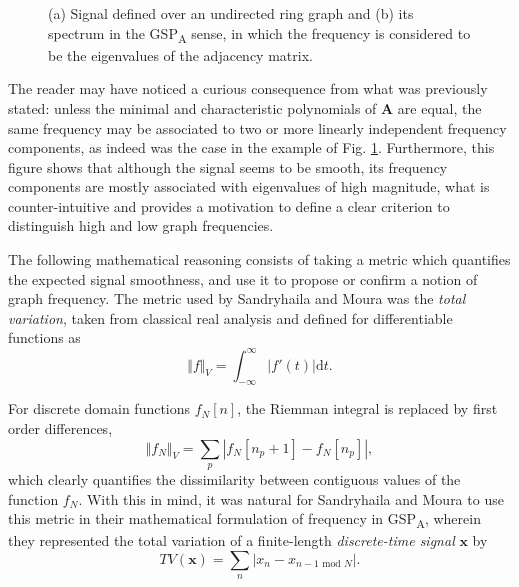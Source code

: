 \begin{figure}
\begin{minipage}[c]{0.25\linewidth}
{		}
	\end{minipage}%
	\caption{(a) Signal defined over an undirected ring graph and (b) its spectrum in the GSP\textsubscript{A} sense, in which the frequency is considered to be the eigenvalues of the adjacency matrix.}%
	\label{fig:diff_struct_GSPA}%
	\vspace{-0.2cm}
\end{figure}

The reader may have noticed a curious consequence from what was previously stated: unless the minimal and characteristic polynomials of $ \mathbf{A} $ are equal, the same frequency may be associated to two or more linearly independent frequency components, as indeed was the case in the example of Fig. \ref{fig:diff_struct_GSPA}. Furthermore, this figure shows that although the signal seems to be smooth, its frequency components are mostly associated with eigenvalues of high magnitude, what is counter-intuitive and provides a motivation to define a clear criterion to distinguish high and low graph frequencies.

The following mathematical reasoning consists of taking a metric which quantifies the expected signal smoothness, and use it to propose or confirm a notion of graph frequency. The metric used by Sandryhaila and Moura was the \emph{total variation}, taken from classical real analysis and defined for differentiable functions as \cite{rudin1987real,mallat1999wavelet}
\begin{equation}
\Vert f \Vert_V = \int_{-\infty}^{\infty} |f'(t)| \mathrm{d}t.
\end{equation}

For discrete domain functions $ f_N[n] $, the Riemman integral is replaced by first order differences,
\begin{equation}
\Vert f_N \Vert_V = \sum_p |f_N[n_p + 1] - f_N[n_p]|,
\end{equation}
which clearly quantifies the dissimilarity between contiguous values of the function $ f_N $. With this in mind, it was natural for Sandryhaila and Moura to use this metric in their mathematical formulation of frequency in GSP\textsubscript{A}, wherein they represented the total variation of a finite-length \emph{discrete-time signal} $ \mathbf{x} $ by
\begin{equation}
\label{eq:TV}
TV(\mathbf{x}) = \sum_n | x_n - x_{n-1 \text{ mod } N}|.
\end{equation}


